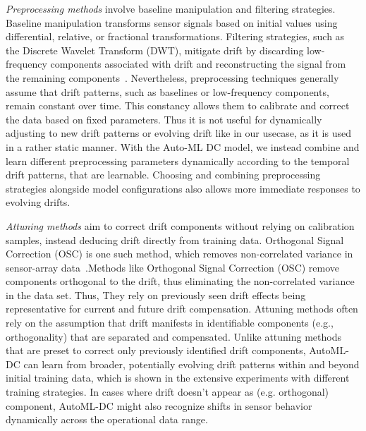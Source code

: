 \emph{Preprocessing methods} involve baseline manipulation and filtering strategies. Baseline manipulation transforms sensor signals based on initial values using differential, relative, or fractional transformations. Filtering strategies, such as the Discrete Wavelet Transform (DWT), mitigate drift by discarding low-frequency components associated with drift and reconstructing the signal from the remaining components~\cite{HUI2003354}. Nevertheless, preprocessing techniques generally assume that drift patterns, such as baselines or low-frequency components, remain constant over time. This constancy allows them to calibrate and correct the data based on fixed parameters. Thus it is not useful for dynamically adjusting to new drift patterns or evolving drift like in our usecase, as it is used in a rather static manner. With the Auto-ML DC model, we instead combine and learn different preprocessing parameters dynamically according to the temporal drift patterns, that are learnable. Choosing and combining preprocessing strategies alongside model configurations also allows more immediate responses to evolving drifts. 

\emph{Attuning methods} aim to correct drift components without relying on calibration samples, instead deducing drift directly from training data. Orthogonal Signal Correction (OSC) is one such method, which removes non-correlated variance in sensor-array data~\cite{PADILLA201028}.Methods like Orthogonal Signal Correction (OSC) remove components orthogonal to the drift, thus eliminating the non-correlated variance in the data set. Thus, They rely on previously seen drift effects being representative for current and future drift compensation. Attuning methods often rely on the assumption that drift manifests in identifiable components (e.g., orthogonality) that are separated and compensated. Unlike attuning methods that are preset to correct only previously identified drift components, AutoML-DC can learn from broader, potentially evolving drift patterns within and beyond initial training data, which is shown in the extensive experiments with different training strategies. In cases where drift doesn’t appear as (e.g. orthogonal) component, AutoML-DC might also recognize shifts in sensor behavior dynamically across the operational data range.

